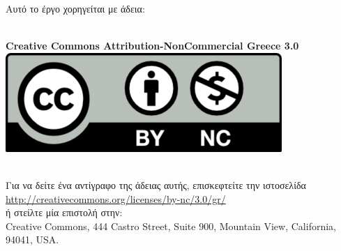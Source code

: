 {\small Αυτό το έργο χορηγείται με άδεια:}
\begin{center}
\\ \textbf{Creative Commons Attribution-NonCommercial Greece 3.0}
\\ \null
\includegraphics{CC-BY-NC}

\begin{footnotesize}
\\ \null Για να δείτε ένα αντίγραφο της άδειας αυτής, επισκεφτείτε την ιστοσελίδα \href{http://creativecommons.org/licenses/by-nc/3.0/gr/}{http://creativecommons.org/licenses/by-nc/3.0/gr/} 
\\ή στείλτε μία επιστολή στην:
\\Creative Commons, 444 Castro Street, Suite 900, Mountain View, California, 94041, USA.
\end{footnotesize}
\end{center}